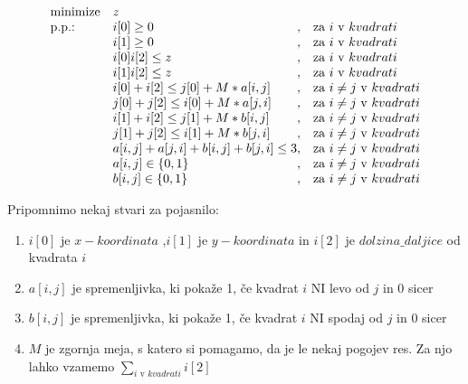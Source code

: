 \documentclass[a4paper, 11pt]{article}
\begin{document}
 \begin{equation*}
    \begin{array}{ll@{}ll}
    \text{minimize}  & z &\\
    \text{p.p.:}& i[0] \geq 0 & ,  & \text{za $i$ v $kvadrati$}\\
                & i[1] \geq 0 & ,  & \text{za $i$ v $kvadrati$}\\
                & i[0] i[2] \leq z & ,  & \text{za $i$ v $kvadrati$}\\
                & i[1] i[2] \leq z & ,  & \text{za $i$ v $kvadrati$}\\
                & i[0] + i[2] \leq j[0] + M * a[i,j]& , &\text{za $i \neq j $ v $kvadrati$} \\
                & j[0] + j[2] \leq i[0] + M * a[j,i]& , &\text{za $i \neq j $ v $kvadrati$} \\
                & i[1] + i[2] \leq j[1] + M * b[i,j]& , &\text{za $i \neq j $ v $kvadrati$} \\
                & j[1] + j[2] \leq i[1] + M * b[j,i]& , &\text{za $i \neq j $ v $kvadrati$} \\
                & a[i, j] + a[j, i] + b[i, j] + b[j, i] \leq 3& , &\text{za $i \neq j $ v $kvadrati$} \\
                & a[i,j] \in \{0,1\} & , &\text{za $i \neq j $ v $kvadrati$} \\
                & b[i,j] \in \{0,1\} & , &\text{za $i \neq j $ v $kvadrati$} \\
    \end{array}
    \end{equation*}

Pripomnimo nekaj stvari za pojasnilo:
\begin{enumerate}\label{opombice}
    \item  $i[0]$ je $x-koordinata$ ,$i[1]$ je $y-koordinata$ in $i[2]$ je $dolzina\_daljice$ od kvadrata $i$
    \item $a[i,j]$ je spremenljivka, ki pokaže 1, če kvadrat $i$ NI levo od $j$ in 0 sicer
    \item $b[i,j]$ je spremenljivka, ki pokaže 1, če kvadrat $i$ NI spodaj od $j$ in 0 sicer
    \item $M$ je zgornja meja, s katero si pomagamo, da je le nekaj pogojev res. Za njo lahko vzamemo $\displaystyle\sum\limits_{\text{$i$ v }kvadrati}i[2]$
\end{enumerate}
\end{document}
